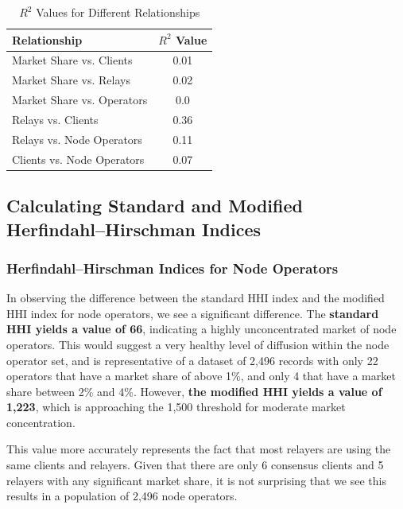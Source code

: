 \documentclass[conference]{IEEEtran}
\begin{document}
\begin{table}[htbp]
    \centering
    \normalsize
    \renewcommand{\arraystretch}{1.2}
    \begin{tabular}{|p{6cm}|c|}
        \hline
        \textbf{Relationship} & \textbf{$R^2$ Value} \\
        \hline
        Market Share vs. Clients & 0.01 \\ \hline
        Market Share vs. Relays & 0.02 \\ \hline
        Market Share vs. Operators & 0.0 \\ \hline
        Relays vs. Clients & 0.36 \\ \hline
        Relays vs. Node Operators & 0.11 \\ \hline
        Clients vs. Node Operators & 0.07 \\ \hline
    \end{tabular}
    \vspace{10pt}
    \caption{$R^2$ Values for Different Relationships}
    \label{tab:r2-value-staking-pools}
\end{table}

\subsection{Calculating Standard and Modified Herfindahl–Hirschman Indices}

\subsubsection{Herfindahl–Hirschman Indices for Node Operators}

In observing the difference between the standard HHI index and the modified HHI index for node operators, we see a significant difference.  The \textbf{standard HHI yields a value of 66}, indicating a highly unconcentrated market of node operators.  This would suggest a very healthy level of diffusion within the node operator set, and is representative of a dataset of 2,496 records with only 22 operators that have a market share of above 1\%, and only 4 that have a market share between 2\% and 4\%.  However, \textbf{the modified HHI yields a value of 1,223}, which is approaching the 1,500 threshold for moderate market concentration.

This value more accurately represents the fact that most relayers are using the same clients and relayers.  Given that there are only 6 consensus clients and 5 relayers with any significant market share, it is not surprising that we see this results in a population of 2,496 node operators.
\end{document}

